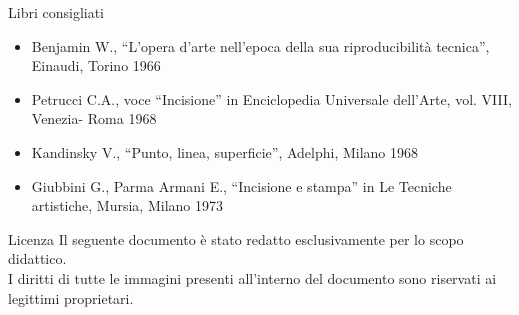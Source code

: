 \documentclass[hidelinks,aspectratio=169]{beamer}
\begin{document}
\begin{frame}{Libri consigliati}
		\begin{itemize}
			\item \tiny{Benjamin W., “L’opera d’arte nell’epoca della sua riproducibilità tecnica”, Einaudi, Torino 1966}
			\item \tiny{Petrucci C.A., voce “Incisione” in Enciclopedia Universale dell’Arte, vol. VIII, Venezia- Roma 1968}
			\item \tiny{Kandinsky V., “Punto, linea, superficie”, Adelphi, Milano 1968}
			\item \tiny{Giubbini G., Parma Armani E., “Incisione e stampa” in Le Tecniche artistiche, Mursia, Milano 1973}
		\end{itemize}
	\end{frame}
	
	\begin{frame}{Licenza}
		Il seguente documento è stato redatto esclusivamente per lo scopo didattico.\\
		I diritti di tutte le immagini presenti all'interno del documento sono riservati ai legittimi proprietari.\\
		\vspace*{\fill}
		\doclicenseThis
	\end{frame}
	
\end{document}
